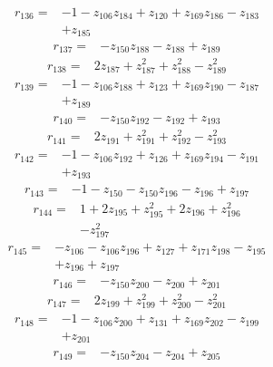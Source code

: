 \begin{align*}
r_{136}={}&-1 -z_{106}z_{184} +z_{120} +z_{169}z_{186} -z_{183}\\
&+z_{185}
\end{align*}
\begin{align*}
r_{137}={}&-z_{150}z_{188} -z_{188} +z_{189}
\end{align*}
\begin{align*}
r_{138}={}&2z_{187} +z_{187}^{2} +z_{188}^{2} -z_{189}^{2}
\end{align*}
\begin{align*}
r_{139}={}&-1 -z_{106}z_{188} +z_{123} +z_{169}z_{190} -z_{187}\\
&+z_{189}
\end{align*}
\begin{align*}
r_{140}={}&-z_{150}z_{192} -z_{192} +z_{193}
\end{align*}
\begin{align*}
r_{141}={}&2z_{191} +z_{191}^{2} +z_{192}^{2} -z_{193}^{2}
\end{align*}
\begin{align*}
r_{142}={}&-1 -z_{106}z_{192} +z_{126} +z_{169}z_{194} -z_{191}\\
&+z_{193}
\end{align*}
\begin{align*}
r_{143}={}&-1 -z_{150} -z_{150}z_{196} -z_{196} +z_{197}
\end{align*}
\begin{align*}
r_{144}={}&1 +2z_{195} +z_{195}^{2} +2z_{196} +z_{196}^{2}\\
&-z_{197}^{2}
\end{align*}
\begin{align*}
r_{145}={}&-z_{106} -z_{106}z_{196} +z_{127} +z_{171}z_{198} -z_{195}\\
&+z_{196} +z_{197}
\end{align*}
\begin{align*}
r_{146}={}&-z_{150}z_{200} -z_{200} +z_{201}
\end{align*}
\begin{align*}
r_{147}={}&2z_{199} +z_{199}^{2} +z_{200}^{2} -z_{201}^{2}
\end{align*}
\begin{align*}
r_{148}={}&-1 -z_{106}z_{200} +z_{131} +z_{169}z_{202} -z_{199}\\
&+z_{201}
\end{align*}
\begin{align*}
r_{149}={}&-z_{150}z_{204} -z_{204} +z_{205}
\end{align*}
